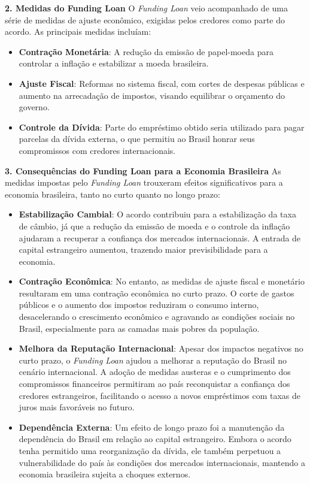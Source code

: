 \documentclass[a4paper,12pt]{article}[abntex2]
\begin{document}
\textbf{2. Medidas do Funding Loan}
O \textit{Funding Loan} veio acompanhado de uma série de medidas de ajuste econômico, exigidas pelos credores como parte do acordo. As principais medidas incluíam:

\begin{itemize}
    \item \textbf{Contração Monetária}: A redução da emissão de papel-moeda para controlar a inflação e estabilizar a moeda brasileira.
    \item \textbf{Ajuste Fiscal}: Reformas no sistema fiscal, com cortes de despesas públicas e aumento na arrecadação de impostos, visando equilibrar o orçamento do governo.
    \item \textbf{Controle da Dívida}: Parte do empréstimo obtido seria utilizado para pagar parcelas da dívida externa, o que permitiu ao Brasil honrar seus compromissos com credores internacionais.
\end{itemize}

\textbf{3. Consequências do Funding Loan para a Economia Brasileira}
As medidas impostas pelo \textit{Funding Loan} trouxeram efeitos significativos para a economia brasileira, tanto no curto quanto no longo prazo:

\begin{itemize}
    \item \textbf{Estabilização Cambial}: O acordo contribuiu para a estabilização da taxa de câmbio, já que a redução da emissão de moeda e o controle da inflação ajudaram a recuperar a confiança dos mercados internacionais. A entrada de capital estrangeiro aumentou, trazendo maior previsibilidade para a economia.
    
    \item \textbf{Contração Econômica}: No entanto, as medidas de ajuste fiscal e monetário resultaram em uma contração econômica no curto prazo. O corte de gastos públicos e o aumento dos impostos reduziram o consumo interno, desacelerando o crescimento econômico e agravando as condições sociais no Brasil, especialmente para as camadas mais pobres da população.
    
    \item \textbf{Melhora da Reputação Internacional}: Apesar dos impactos negativos no curto prazo, o \textit{Funding Loan} ajudou a melhorar a reputação do Brasil no cenário internacional. A adoção de medidas austeras e o cumprimento dos compromissos financeiros permitiram ao país reconquistar a confiança dos credores estrangeiros, facilitando o acesso a novos empréstimos com taxas de juros mais favoráveis no futuro.
    
    \item \textbf{Dependência Externa}: Um efeito de longo prazo foi a manutenção da dependência do Brasil em relação ao capital estrangeiro. Embora o acordo tenha permitido uma reorganização da dívida, ele também perpetuou a vulnerabilidade do país às condições dos mercados internacionais, mantendo a economia brasileira sujeita a choques externos.
\end{itemize}
\end{document}
